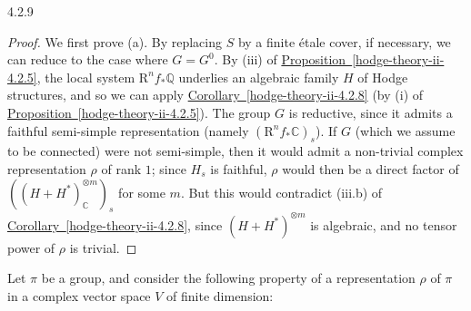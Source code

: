\begin{corollary}{4.2.9}
\begin{enumerate}
    \end{enumerate}\begin{proof}\par{}We first prove (a).
      By replacing \(S\) by a finite étale cover, if necessary, we can reduce to the case where \(G=G^0\).
      By (iii) of \hyperref[hodge-theory-ii-4.2.5]{Proposition~\ref*{hodge-theory-ii-4.2.5}}, the local system \(\mathrm {R}^nf_*\mathbb {Q}\) underlies an algebraic family \(H\) of Hodge structures, and so we can apply \hyperref[hodge-theory-ii-4.2.8]{Corollary~\ref*{hodge-theory-ii-4.2.8}} (by (i) of \hyperref[hodge-theory-ii-4.2.5]{Proposition~\ref*{hodge-theory-ii-4.2.5}}).
      The group \(G\) is reductive, since it admits a faithful semi-simple representation (namely \((\mathrm {R}^nf_*\mathbb {C})_s\)).
      If \(G\) (which we assume to be connected) were not semi-simple, then it would admit a non-trivial complex representation \(\rho \) of rank \(1\);
      since \(H_s\) is faithful, \(\rho \) would then be a direct factor of \(((H+H^*)_\mathbb {C}^{\otimes  m})_s\) for some \(m\).
      But this would contradict (iii.b) of \hyperref[hodge-theory-ii-4.2.8]{Corollary~\ref*{hodge-theory-ii-4.2.8}}, since \((H+H^*)^{\otimes  m}\) is algebraic, and no tensor power of \(\rho \) is trivial.\end{proof}\end{corollary}\par{}Let \(\pi \) be a group, and consider the following property of a representation \(\rho \) of \(\pi \) in a complex vector space \(V\) of finite dimension:

